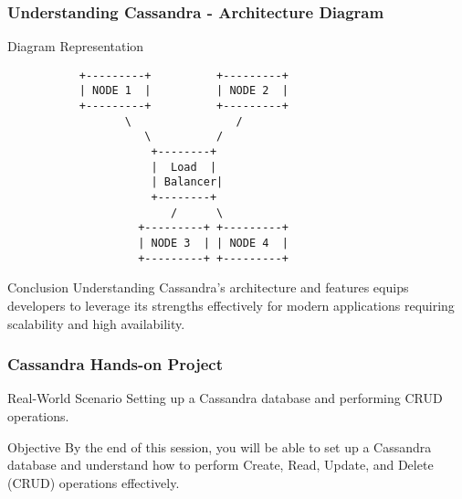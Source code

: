 \documentclass[aspectratio=169]{beamer}
\begin{document}
\begin{frame}[fragile]
    \frametitle{Understanding Cassandra - Architecture Diagram}
    \begin{block}{Diagram Representation}
    \begin{verbatim}
           +---------+          +---------+
           | NODE 1  |          | NODE 2  |
           +---------+          +---------+
                  \                /
                     \          /
                      +--------+
                      |  Load  |
                      | Balancer|
                      +--------+
                         /      \
                    +---------+ +---------+
                    | NODE 3  | | NODE 4  |
                    +---------+ +---------+
    \end{verbatim}
    \end{block}
    
    \begin{block}{Conclusion}
        Understanding Cassandra's architecture and features equips developers to leverage its strengths effectively for modern applications requiring scalability and high availability.
    \end{block}
\end{frame}

\begin{frame}[fragile]
    \frametitle{Cassandra Hands-on Project}
    \begin{block}{Real-World Scenario}
        Setting up a Cassandra database and performing CRUD operations.
    \end{block}
    \begin{block}{Objective}
        By the end of this session, you will be able to set up a Cassandra database and understand how to perform Create, Read, Update, and Delete (CRUD) operations effectively.
    \end{block}
\end{frame}
\end{document}
